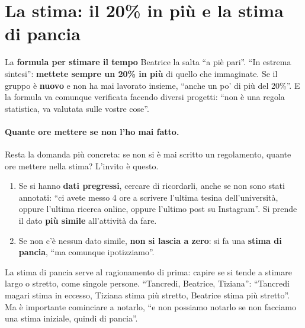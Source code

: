 \section{La stima: il 20\% in più e la stima di pancia}
\label{a9:sec:stima}



La \textbf{formula per stimare il tempo} Beatrice la salta ``a piè pari''. ``In
estrema sintesi'': \textbf{mettete sempre un 20\% in più} di quello che immaginate.
Se il gruppo è \textbf{nuovo} e non ha mai lavorato insieme, ``anche un po' di più del
20\%''. E la formula va comunque verificata facendo diversi progetti: ``non è una
regola statistica, va valutata sulle vostre cose''.

\paragraph{Quante ore mettere se non l'ho mai fatto.} Resta la domanda più concreta:
se non si è mai scritto un regolamento, quante ore mettere nella stima? L'invito è
questo.
\begin{enumerate}
  \item Se si hanno \textbf{dati pregressi}, cercare di ricordarli, anche se non sono
        stati annotati: ``ci avete messo 4 ore a scrivere l'ultima tesina
        dell'università, oppure l'ultima ricerca online, oppure l'ultimo post su
        Instagram''. Si prende il dato \textbf{più simile} all'attività da fare.
  \item Se non c'è nessun dato simile, \textbf{non si lascia a zero}: si fa una
        \textbf{stima di pancia}, ``ma comunque ipotizziamo''.
\end{enumerate}
La stima di pancia serve al ragionamento di prima: capire se si tende a stimare largo
o stretto, come singole persone. ``Tancredi, Beatrice, Tiziana'': ``Tancredi magari
stima in eccesso, Tiziana stima più stretto, Beatrice stima più stretto''. Ma è
importante cominciare a notarlo, ``e non possiamo notarlo se non facciamo una stima
iniziale, quindi di pancia''.

